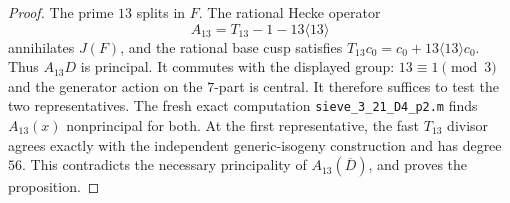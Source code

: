 \begin{proof}
The prime $13$ splits in $F$. The rational Hecke operator
\[
 A_{13}=T_{13}-1-13\langle13\rangle
\]
annihilates $J(F)$, and the rational base cusp satisfies
$T_{13}c_0=c_0+13\langle13\rangle c_0$.
Thus $A_{13}D$ is principal. It commutes with the displayed group:
$13\equiv1\pmod3$ and the generator action on the
$7$-part is central. It therefore suffices to test the two
representatives. The fresh exact computation
\texttt{sieve\_3\_21\_D4\_p2.m} finds $A_{13}(x)$
nonprincipal for both. At the first representative,
the fast $T_{13}$ divisor agrees exactly with the
independent generic-isogeny construction and has degree $56$.
This contradicts the necessary principality of
$A_{13}(\overline D)$, and proves the proposition.
\end{proof}

